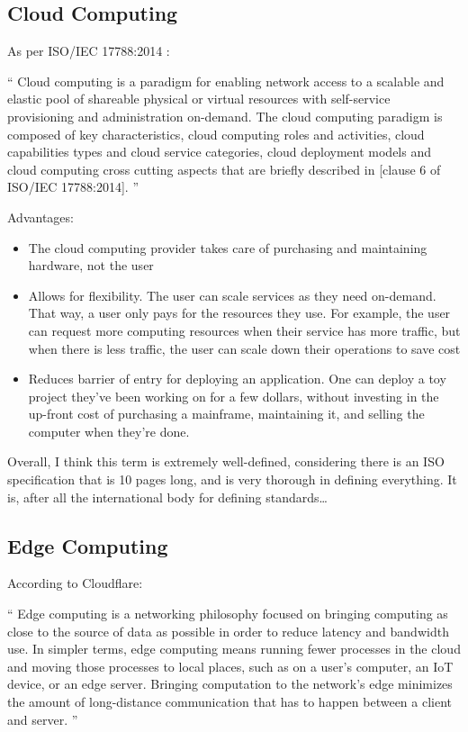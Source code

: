 \subsection{Cloud Computing}

As per ISO/IEC 17788:2014 :
\begin{displayquote}
  ``
Cloud computing is a paradigm for enabling network access to a scalable and elastic pool of shareable physical or
virtual resources with self-service provisioning and administration on-demand. The cloud computing paradigm is
composed of key characteristics, cloud computing roles and activities, cloud capabilities types and cloud service
categories, cloud deployment models and cloud computing cross cutting aspects
that are briefly described in [clause 6 of ISO/IEC 17788:2014].
''
\end{displayquote}
Advantages:
\begin{itemize}
  \item The cloud computing provider takes care of purchasing and maintaining
hardware, not the user
\item Allows for flexibility. The user can scale services as they need
  on-demand. That way, a user only pays for the resources they use. For example,
  the user can request more computing resources when their service has more
  traffic, but when there is less traffic, the user can scale down their
  operations to save cost
\item Reduces barrier of entry for deploying an application. One can deploy a
  toy project they've been working on for a few dollars, without investing in
  the up-front cost of purchasing a mainframe, maintaining it, and selling the
  computer when they're done.
\end{itemize}

Overall, I think this term is extremely well-defined, considering there is an
ISO specification that is 10 pages long, and is very thorough in defining
everything. It is, after all the international body for defining standards\dots

\subsection{Edge Computing}
According to Cloudflare: 
\begin{displayquote}
  ``
  Edge computing is a networking philosophy focused on bringing computing as close to the source of data as possible in order to reduce latency and bandwidth use. In simpler terms, edge computing means running fewer processes in the cloud and moving those processes to local places, such as on a user’s computer, an IoT device, or an edge server. Bringing computation to the network’s edge minimizes the amount of long-distance communication that has to happen between a client and server.
  ''
\end{displayquote}

